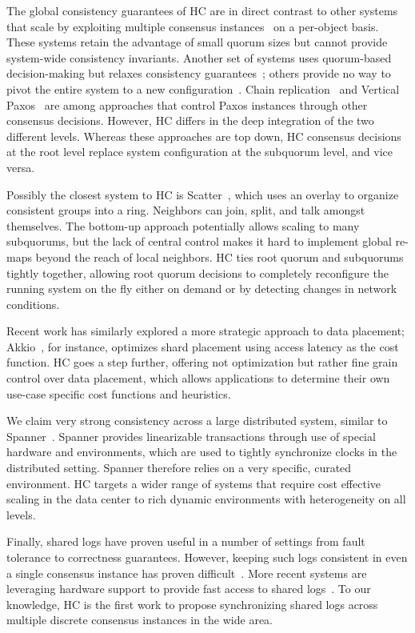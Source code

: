 \documentclass[10pt,conference]{IEEEtran}
\newcommand{\sub}{subquorum\xspace}
\newcommand{\subs}{subquorums\xspace}
\newcommand{\roo}{root quorum\xspace}
\begin{document}
The global consistency guarantees of HC are in direct contrast to other
systems that scale by exploiting multiple consensus
instances~\cite{mdcc,spanner} on a per-object basis.
These systems retain the advantage of small quorum sizes but cannot provide
system-wide consistency invariants.
Another set of systems uses quorum-based decision-making but relaxes
consistency guarantees~\cite{dynamo,pnuts}; others provide no way to
pivot the entire system to a new configuration~\cite{scatter}.
Chain replication~\cite{chain_replication} and Vertical Paxos~\cite{vertical_paxos,niobe}
are among approaches that control Paxos instances through other consensus decisions.
However, HC differs in the deep integration of the two different levels.
Whereas these approaches are top down, HC consensus decisions at the root
level replace system configuration at the \sub level, and vice versa.

Possibly the closest system to HC is Scatter~\cite{scatter}, which uses an
overlay to organize consistent groups into a ring.
Neighbors can join, split, and talk amongst themselves.
The bottom-up approach potentially allows scaling to many
\subs, but the lack of central control makes it hard to implement global
re-maps beyond the reach of local neighbors.
HC ties \roo and \subs tightly together, allowing \roo decisions to
completely reconfigure the running system on the fly either on demand or
by detecting changes in network conditions.

Recent work has similarly explored a more strategic approach to data placement;
Akkio~\cite{akkio}, for instance, optimizes shard placement using access
latency as the cost function.
HC goes a step further, offering not optimization but rather fine grain control
over data placement, which allows applications to determine their own
use-case specific cost functions and heuristics.

We claim very strong consistency across a large distributed system, similar
to Spanner~\cite{spanner}.
Spanner provides linearizable  transactions through use of special hardware
and environments, which are used to tightly synchronize clocks in the
distributed setting.
Spanner therefore relies on a very specific, curated environment.
HC targets a wider range of systems that require cost effective scaling in
the data center to rich dynamic environments with heterogeneity on all levels.

Finally, shared logs have proven useful in a number of settings from fault
tolerance to correctness guarantees.
However, keeping such logs consistent in even a single consensus instance has
proven difficult~\cite{chubby,zookeeper}.
More recent systems are leveraging hardware support to provide fast access to
shared logs~\cite{vcorfu,tango,fawn}.
To our knowledge, HC is the first work to propose synchronizing shared logs
across multiple discrete consensus instances in the wide area.
\end{document}
